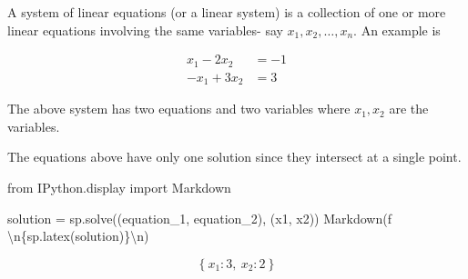 \documentclass[
  letterpaper,
  DIV=11,
  numbers=noendperiod]{scrreprt}
\newenvironment{Shaded}{\begin{snugshade}}{\end{snugshade}}
\newcommand{\CharTok}[1]{\textcolor[rgb]{0.13,0.47,0.30}{#1}}
\newcommand{\ImportTok}[1]{\textcolor[rgb]{0.00,0.46,0.62}{#1}}
\newcommand{\NormalTok}[1]{\textcolor[rgb]{0.00,0.23,0.31}{#1}}
\newcommand{\OperatorTok}[1]{\textcolor[rgb]{0.37,0.37,0.37}{#1}}
\newcommand{\SpecialCharTok}[1]{\textcolor[rgb]{0.37,0.37,0.37}{#1}}
\newcommand{\SpecialStringTok}[1]{\textcolor[rgb]{0.13,0.47,0.30}{#1}}
\begin{document}
\begin{tcolorbox}[enhanced jigsaw, colbacktitle=quarto-callout-note-color!10!white, colback=white, colframe=quarto-callout-note-color-frame, title=\textcolor{quarto-callout-note-color}{\faInfo}\hspace{0.5em}{Definition of a system of linear equations}, opacityback=0, coltitle=black, left=2mm, leftrule=.75mm, rightrule=.15mm, opacitybacktitle=0.6, bottomrule=.15mm, titlerule=0mm, bottomtitle=1mm, breakable, toptitle=1mm, arc=.35mm, toprule=.15mm]

A system of linear equations (or a linear system) is a collection of one
or more linear equations involving the same variables- say
\(x_1, x_2, \ldots, x_n\). An example is

\[
\begin{align*}
x_1 - 2x_2 &= -1\\
-x_1 + 3x_2 &= 3
\end{align*}
\]

The above system has two equations and two variables where \(x_1, x_2\)
are the variables.

\end{tcolorbox}

The equations above have only one solution since they intersect at a
single point.

\begin{Shaded}
\begin{Highlighting}[]
\ImportTok{from}\NormalTok{ IPython.display }\ImportTok{import}\NormalTok{ Markdown}

\NormalTok{solution }\OperatorTok{=}\NormalTok{ sp.solve((equation\_1, equation\_2), (x1, x2))}
\NormalTok{Markdown(}\SpecialStringTok{f\textquotesingle{}$$}\CharTok{\textbackslash{}n}\SpecialCharTok{\{}\NormalTok{sp}\SpecialCharTok{.}\NormalTok{latex(solution)}\SpecialCharTok{\}}\CharTok{\textbackslash{}n}\SpecialStringTok{$$\textquotesingle{}}\NormalTok{)}
\end{Highlighting}
\end{Shaded}

\[
\left\{ x_{1} : 3, \  x_{2} : 2\right\}
\]
\end{document}
